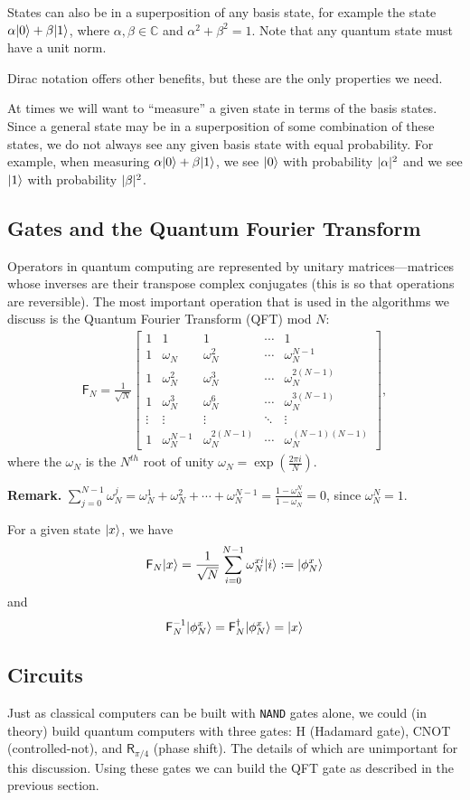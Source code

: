 \documentclass[letterpaper]{article}
\DeclarePairedDelimiter{\ket}{\lvert}{\rangle}
\DeclarePairedDelimiter{\abs}{\lvert}{\rvert}
\newcommand{\op}[1]{\textsf{#1}}
\newcommand{\complex}{\mathbb{C}}
\renewcommand{\o}[2]{\omega_{#1}^{#2}}
\begin{document}
	States can also be in a superposition of any basis state, for example the
	state $\alpha\ket0+\beta\ket1$, where $\alpha,\beta\in\complex$ and
	$\alpha^2+\beta^2=1$. Note that any quantum state must have a unit norm.
	
	Dirac notation offers other benefits, but these are the only properties we need.
	
	At times we will want to ``measure'' a given state in terms of the basis states. Since a general state may be in a superposition of some combination of these states, we do not always see any given basis state with equal probability. For example, when measuring $\alpha\ket0+\beta\ket1$, we see $\ket0$ with probability $\abs{\alpha}^2$ and we see $\ket1$ with probability $\abs{\beta}^2$.
	\subsection{Gates and the Quantum Fourier Transform}
	Operators in quantum computing are represented by unitary
	matrices---matrices whose inverses are their transpose complex conjugates
	(this is so that operations are reversible). The most important operation
	that is used in the algorithms we discuss is the Quantum Fourier Transform
	(QFT) mod $N$:
		\begin{align*}
			\op{F}_N = \frac{1}{\sqrt{N}}
			\begin{bmatrix}1 & 1 & 1 & \cdots & 1\\
				1 & \o{N}{} & \o{N}{2} & \cdots & \o{N}{N-1}\\
				1 & \o{N}{2} & \o{N}{3} & \cdots & \o{N}{2(N-1)}\\
				1 & \o{N}{3} & \o{N}{6} & \cdots & \o{N}{3(N-1)}\\
				\vdots & \vdots & \vdots &  \ddots & \vdots\\
				1 & \o{N}{N-1} & \o{N}{2(N-1)} & \cdots &
				\o{N}{(N-1)(N-1)}
		\end{bmatrix},
		\end{align*}
	where the $\o{N}{}$ is the $N^{th}$ root of unity
	$\o{N}{}=\exp(\frac{2\pi i}{N})$.

	\textbf{Remark.} $\sum_{j=0}^{N-1}\o{N}{j} = \o{N}{1} + \o{N}{2} + \cdots +
	\o{N}{N-1} = \frac{1-\o{N}{N}}{1-\o{N}{}} = 0$, since $\o{N}{N}=1$.

	For a given state $\ket{x}$, we have \[\op{F}_N\ket{x} =
	\frac{1}{\sqrt{N}}\sum_{i=0}^{N-1} \o{N}{xi}\ket{i} := \ket{\phi^x_N}\] and
	\[\op{F}_N^{-1}\ket{\phi^x_N} = \op{F}_N^{\dagger}\ket{\phi^x_N} = \ket{x}\]
	\subsection{Circuits}
	Just as classical computers can be built with \texttt{NAND} gates alone, we
	could (in theory) build quantum computers with three gates: \op{H} (Hadamard
			gate), 
	\op{CNOT} (controlled-not), and $\op{R}_{\pi/4}$ (phase shift). The details
	of which are unimportant for this discussion. Using these gates we can build the QFT gate as
	described in the previous section.
\end{document}
